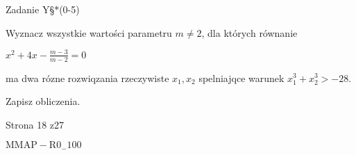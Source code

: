 \documentclass[a4paper,12pt]{article}
\begin{document}
Zadanie Y\S$*$(0-5)

Wyznacz wszystkie wartości parametru $m\neq 2$, dla których równanie

$x^{2}+4x-\displaystyle \frac{m-3}{m-2}=0$

ma dwa rózne rozwiqzania rzeczywiste $x_{1}, x_{2}$ spelniajqce warunek $x_{1}^{3}+x_{2}^{3}>-28.$

Zapisz obliczenia.

Strona 18 z27

$\mathrm{M}\mathrm{M}\mathrm{A}\mathrm{P}-\mathrm{R}0_{-}100$
\end{document}
